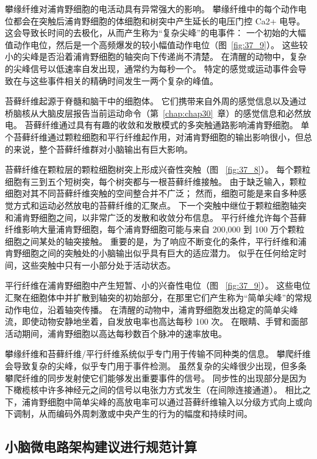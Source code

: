 攀缘纤维对浦肯野细胞的电活动具有异常强大的影响。
攀缘纤维中的每个动作电位都会在突触后浦肯野细胞的体细胞和树突中产生延长的电压门控 Ca2+ 电导。
这会导致长时间的去极化，从而产生称为“复杂尖峰”的电事件：
一个初始的大幅值动作电位，然后是一个高频爆发的较小幅值动作电位（图~\ref{fig:37_9}）。
这些较小的尖峰是否沿着浦肯野细胞的轴突向下传递尚不清楚。
在清醒的动物中，复杂的尖峰信号以低速率自发出现，通常约为每秒一个。
特定的感觉或运动事件会导致在与这些事件相关的精确时间发生一两个复杂的峰值。


苔藓纤维起源于脊髓和脑干中的细胞体。
它们携带来自外周的感觉信息以及通过桥脑核从大脑皮层报告当前运动命令（第~\ref{chap:chap30}~章）的感觉信息和必然放电。
苔藓纤维通过具有有趣的收敛和发散模式的多突触通路影响浦肯野细胞。
单个苔藓纤维通过颗粒细胞和平行纤维起作用，对浦肯野细胞的输出影响很小，但总的来说，整个苔藓纤维群对小脑输出有巨大影响。


苔藓纤维在颗粒层的颗粒细胞树突上形成兴奋性突触（图 ~\ref{fig:37_8}）。
每个颗粒细胞有三到五个短树突，每个树突都与一根苔藓纤维接触。
由于缺乏输入，颗粒细胞对其不同苔藓纤维突触的空间整合并不广泛；
然而，细胞可能是来自多种感觉方式和运动必然放电的苔藓纤维的汇聚点。
下一个突触中继位于颗粒细胞轴突和浦肯野细胞之间，以非常广泛的发散和收敛分布信息。
平行纤维允许每个苔藓纤维影响大量浦肯野细胞，每个浦肯野细胞可能与来自 200,000 到 100 万个颗粒细胞之间某处的轴突接触。
重要的是，为了响应不断变化的条件，平行纤维和浦肯野细胞之间的突触处的小脑输出似乎具有巨大的适应潜力。
似乎在任何给定时间，这些突触中只有一小部分处于活动状态。


平行纤维在浦肯野细胞中产生短暂、小的兴奋性电位（图 ~\ref{fig:37_9}）。
这些电位汇聚在细胞体中并扩散到轴突的初始部分，在那里它们产生称为“简单尖峰”的常规动作电位，沿着轴突传播。
在清醒的动物中，浦肯野细胞发出稳定的简单尖峰流，即使动物安静地坐着，自发放电率也高达每秒 100 次。
在眼睛、手臂和面部活动期间，浦肯野细胞以高达每秒数百个脉冲的速率放电。


攀缘纤维和苔藓纤维/平行纤维系统似乎专门用于传输不同种类的信息。
攀爬纤维会导致复杂的尖峰，似乎专门用于事件检测。
虽然复杂的尖峰很少出现，但多条攀爬纤维的同步发射使它们能够发出重要事件的信号。
同步性的出现部分是因为下橄榄核中许多神经元之间的信号以电张力方式发生（在间隙连接通道）。
相比之下，浦肯野细胞中简单尖峰的高放电率可以通过苔藓纤维输入以分级方式向上或向下调制，从而编码外周刺激或中央产生的行为的幅度和持续时间。



\subsection{小脑微电路架构建议进行规范计算}

